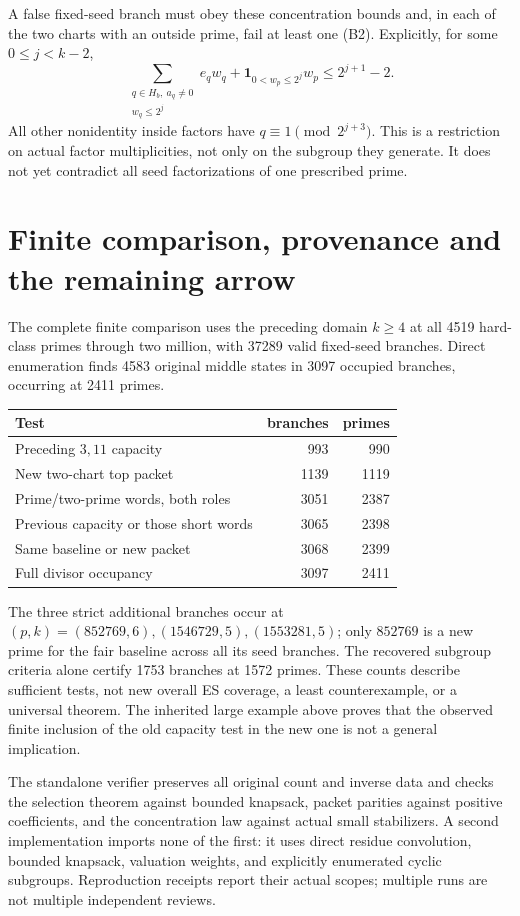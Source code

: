 A false fixed-seed branch must obey these concentration bounds and, in each
of the two charts with an outside prime, fail at least one (B2). Explicitly,
for some $0\le j<k-2$,
\[
 \sum_{\substack{q\in H_b,\ a_q\ne0\\w_q\le2^j}}e_qw_q
 +\mathbf1_{0<w_p\le2^j}w_p
 \le2^{j+1}-2.                                           \tag{E4}
\]
All other nonidentity inside factors have $q\equiv1\pmod{2^{j+3}}$.
This is a restriction on actual factor multiplicities, not only on the
subgroup they generate. It does not yet contradict all seed factorizations
of one prescribed prime.

\section{Finite comparison, provenance and the remaining arrow}
The complete finite comparison uses the preceding domain $k\ge4$ at all
4519 hard-class primes through two million, with 37289 valid fixed-seed
branches. Direct enumeration finds 4583 original middle states in 3097
occupied branches, occurring at 2411 primes.
\begin{center}
\begin{tabular}{lrr}
\toprule
Test & branches & primes\\\midrule
Preceding $3,11$ capacity &993&990\\
New two-chart top packet &1139&1119\\
Prime/two-prime words, both roles &3051&2387\\
Previous capacity or those short words &3065&2398\\
Same baseline or new packet &3068&2399\\
Full divisor occupancy &3097&2411\\\bottomrule
\end{tabular}
\end{center}
The three strict additional branches occur at
$(p,k)=(852769,6),(1546729,5),(1553281,5)$; only $852769$ is a new prime
for the fair baseline across all its seed branches. The recovered subgroup
criteria alone certify 1753 branches at 1572 primes. These counts describe
sufficient tests, not new overall ES coverage, a least counterexample,
or a universal theorem. The inherited large example above proves that the
observed finite inclusion of the old capacity test in the new one is not
a general implication.

The standalone verifier preserves all original count and inverse data and
checks the selection theorem against bounded knapsack, packet parities
against positive coefficients, and the concentration law against actual
small stabilizers. A second implementation imports none of the first: it
uses direct residue convolution, bounded knapsack, valuation weights, and
explicitly enumerated cyclic subgroups. Reproduction receipts report their
actual scopes; multiple runs are not multiple independent reviews.

